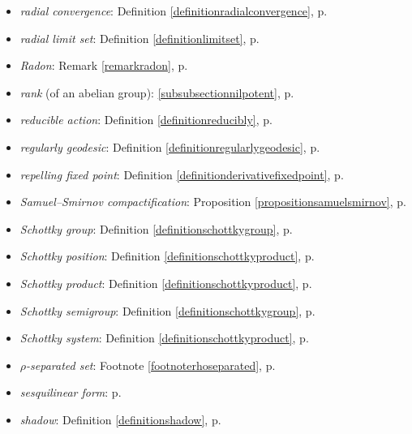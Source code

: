 \begin{itemize}
\item\emph{radial convergence}: Definition \ref{definitionradialconvergence}, p.\pageref{definitionradialconvergence}
\item\emph{radial limit set}: Definition \ref{definitionlimitset}, p.\pageref{definitionlimitset}
\item\emph{Radon}: Remark \ref{remarkradon}, p.\pageref{remarkradon}
\item\emph{rank} (of an abelian group): \6\ref{subsubsectionnilpotent}, p.\pageref{subsubsectionnilpotent}
\item\emph{reducible action}: Definition \ref{definitionreducibly}, p.\pageref{definitionreducibly}
\item\emph{regularly geodesic}: Definition \ref{definitionregularlygeodesic}, p.\pageref{definitionregularlygeodesic}
\item\emph{repelling fixed point}: Definition \ref{definitionderivativefixedpoint}, p.\pageref{definitionderivativefixedpoint}
\item\emph{Samuel--Smirnov compactification}: Proposition \ref{propositionsamuelsmirnov}, p.\pageref{propositionsamuelsmirnov}
\item\emph{Schottky group}: Definition \ref{definitionschottkygroup}, p.\pageref{definitionschottkygroup}
\item\emph{Schottky position}: Definition \ref{definitionschottkyproduct}, p.\pageref{definitionschottkyproduct}
\item\emph{Schottky product}: Definition \ref{definitionschottkyproduct}, p.\pageref{definitionschottkyproduct}
\item\emph{Schottky semigroup}: Definition \ref{definitionschottkygroup}, p.\pageref{definitionschottkygroup}
\item\emph{Schottky system}: Definition \ref{definitionschottkyproduct}, p.\pageref{definitionschottkyproduct}
\item\emph{$\rho$-separated set}: Footnote \ref{footnoterhoseparated}, p.\pageref{footnoterhoseparated}
\item\emph{sesquilinear form}: p.\pageref{subsectionROSSONCT}
\item\emph{shadow}: Definition \ref{definitionshadow}, p.\pageref{definitionshadow}

\end{itemize}
